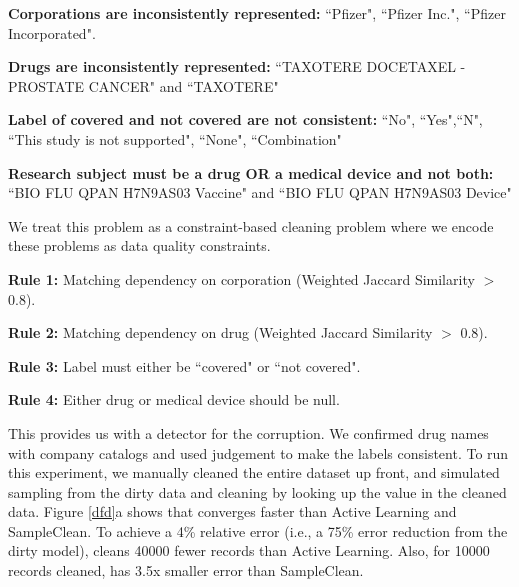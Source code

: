 \vspace{0.25em}

\noindent \textbf{Corporations are inconsistently represented: } ``Pfizer", ``Pfizer Inc.", ``Pfizer Incorporated".

\vspace{0.25em}

\noindent \textbf{Drugs are inconsistently represented: } ``TAXOTERE  DOCETAXEL -PROSTATE CANCER" and ``TAXOTERE"

\vspace{0.25em}

\noindent \textbf{Label of covered and not covered are not consistent: } ``No", ``Yes",``N", ``This study is not supported", ``None", ``Combination"

\vspace{0.25em} 

\noindent \textbf{Research subject must be a drug OR a medical device and not both: } ``BIO FLU QPAN H7N9AS03 Vaccine" and ``BIO FLU QPAN H7N9AS03 Device"

\vspace{0.5em} 

We treat this problem as a constraint-based cleaning problem where we encode these problems as data quality constraints. 

\vspace{0.25em}

\noindent \textbf{Rule 1: } Matching dependency on corporation (Weighted Jaccard Similarity $>$ 0.8).

\vspace{0.25em}

\noindent \textbf{Rule 2: } Matching dependency on drug (Weighted Jaccard Similarity $>$ 0.8).

\vspace{0.25em}

\noindent \textbf{Rule 3: } Label must either be ``covered" or ``not covered".

\vspace{0.25em} 

\noindent \textbf{Rule 4: } Either drug or medical device should be null.

\vspace{0.5em}

This provides us with a detector for the corruption. 
We confirmed drug names with company catalogs and used judgement to make the labels consistent.
To run this experiment, we manually cleaned the entire dataset up front, and simulated sampling from the dirty data and cleaning by looking up the value in the cleaned data.
Figure \ref{dfd}a shows that \sys converges faster than Active Learning and SampleClean.
To achieve a 4\% relative error (i.e., a 75\% error reduction from the dirty model), \sys cleans 40000 fewer records than Active Learning.
Also, for 10000 records cleaned, \sys has 3.5x smaller error than SampleClean.

